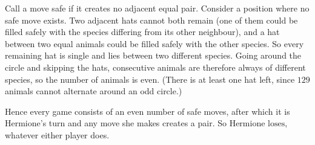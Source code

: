Call a move safe if it creates no adjacent equal pair. Consider a position where no safe move exists. Two adjacent hats cannot both remain (one of them could be filled safely with the species differing from its other neighbour), and a hat between two equal animals could be filled safely with the other species. So every remaining hat is single and lies between two different species. Going around the circle and skipping the hats, consecutive animals are therefore always of different species, so the number of animals is even. (There is at least one hat left, since $129$ animals cannot alternate around an odd circle.)

Hence every game consists of an even number of safe moves, after which it is Hermione's turn and any move she makes creates a pair. So $\boxed{\text{Hermione loses}}$, whatever either player does.
